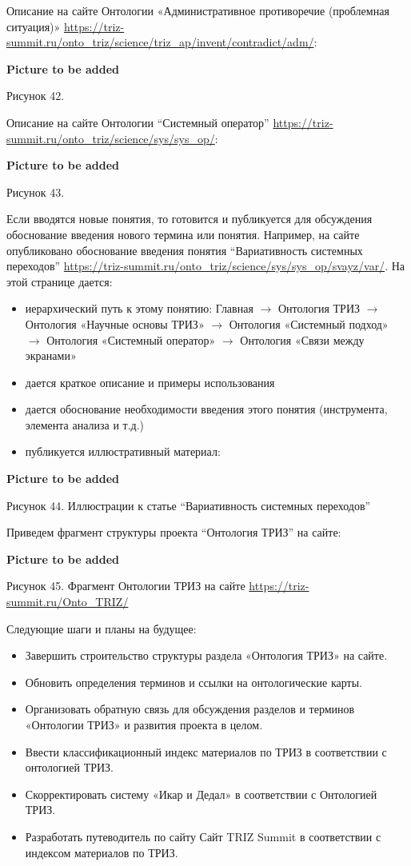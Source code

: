 \documentclass[11pt,a4paper]{article}
\newcommand{\addpicture}{\textbf{Picture to be added}\par}
\begin{document}
Описание на сайте Онтологии «Административное противоречие (проблемная
ситуация)»
\url{https://triz-summit.ru/onto_triz/science/triz_ap/invent/contradict/adm/}:
\begin{center}
  \addpicture
  Рисунок 42.
\end{center}
Описание на сайте Онтологии “Системный оператор”
\url{https://triz-summit.ru/onto_triz/science/sys/sys_op/}:
\begin{center}
  \addpicture
  Рисунок 43.
\end{center}
Если вводятся новые понятия, то готовится и публикуется для обсуждения
обоснование введения нового термина или понятия. Например, на сайте
опубликовано обоснование введения понятия “Вариативность системных переходов”
\url{https://triz-summit.ru/onto_triz/science/sys/sys_op/svayz/var/}. На этой
странице дается:
\begin{itemize}
\item иерархический путь к этому понятию: Главная $\to$ Онтология ТРИЗ $\to$
  Онтология «Научные основы ТРИЗ» $\to$ Онтология «Системный подход» $\to$
  Онтология «Системный оператор» $\to$ Онтология «Связи между экранами»
\item дается краткое описание и примеры использования
\item дается обоснование необходимости введения этого понятия (инструмента,
  элемента анализа и т.д.)
\item публикуется иллюстративный материал:
\end{itemize}
\begin{center}
  \addpicture
  Рисунок 44. Иллюстрации к статье “Вариативность системных переходов”
\end{center}
Приведем фрагмент структуры проекта “Онтология ТРИЗ” на сайте:
\begin{center}
  \addpicture
  Рисунок 45. Фрагмент Онтологии ТРИЗ на сайте
  \url{https://triz-summit.ru/Onto_TRIZ/}
\end{center}
Следующие шаги и планы на будущее: 
\begin{itemize}
\item Завершить строительство структуры раздела «Онтология ТРИЗ» на сайте.
\item Обновить определения терминов и ссылки на онтологические карты.
\item Организовать обратную связь для обсуждения разделов и терминов
  «Онтологии ТРИЗ» и развития проекта в целом.
\item Ввести классификационный индекс материалов по ТРИЗ в соответствии с
  онтологией ТРИЗ.
\item Скорректировать систему «Икар и Дедал» в соответствии с Онтологией
  ТРИЗ. 
\item Разработать путеводитель по сайту Сайт TRIZ Summit в соответствии с
  индексом материалов по ТРИЗ.
\end{itemize}
\end{document}
